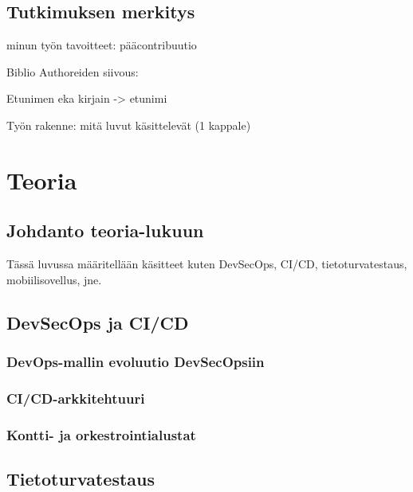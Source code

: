 \documentclass[bscthesis,finnish,oneside,biblatex]{uefcsthesis}
\begin{document}
\section{Tutkimuksen merkitys}
\label{sec:signigicance-of-study}

minun työn tavoitteet: pääcontribuutio

Biblio Authoreiden siivous:

Etunimen eka kirjain -> etunimi

Työn rakenne: mitä luvut käsittelevät (1 kappale)

\chapter{Teoria}
\label{cha:teoria}


\section{Johdanto teoria-lukuun}
\label{sec:teoria-johdanto}

Tässä luvussa määritellään käsitteet kuten DevSecOps, CI/CD, tietoturvatestaus, mobiilisovellus, jne.


\section{DevSecOps ja CI/CD}
\label{sec:devsecops-cicd}
  \subsection{DevOps-mallin evoluutio DevSecOpsiin}
  \subsection{CI/CD-arkkitehtuuri}
  \subsection{Kontti- ja orkestrointialustat}

\section{Tietoturvatestaus}
\label{sec:testing}
\end{document}
